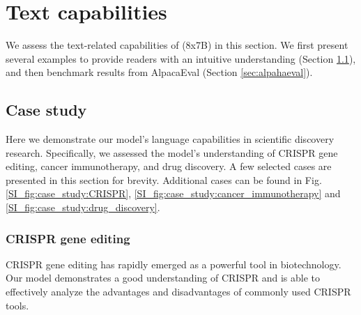 \section{Text capabilities }\label{sec:text_ability}
We assess the text-related capabilities of \ourM{} (8x7B) in this section. We first present several examples to provide readers with an intuitive understanding (Section \ref{sec:case_study}), and then benchmark results from AlpacaEval (Section \ref{sec:alpahaeval}).

\subsection{Case study}\label{sec:case_study}
Here we demonstrate our model's language capabilities in scientific discovery research. Specifically, we assessed the model's understanding of CRISPR gene editing, cancer immunotherapy, and drug discovery. A few selected cases are presented in this section for brevity. Additional cases can be found in Fig. \ref{SI_fig:case_study:CRISPR}, \ref{SI_fig:case_study:cancer_immunotherapy} and \ref{SI_fig:case_study:drug_discovery}.


\subsubsection{CRISPR gene editing}
 CRISPR gene editing has rapidly emerged as a powerful tool in biotechnology. Our model demonstrates a good understanding of CRISPR and is able to effectively analyze the advantages and disadvantages of commonly used CRISPR tools. 

